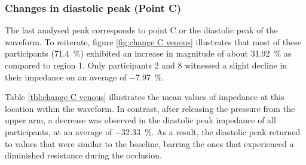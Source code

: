 \subsubsection{Changes in diastolic peak (Point C)}
\label{section apa 2.1.3}
The last analysed peak corresponds to point C or the diastolic peak of the waveform. To reiterate, figure \ref{fig:change C venous} illustrates that most of these participants (\SI{71.4}{\percent}) exhibited an increase in magnitude of about \SI{31.92}{\percent} as compared to region 1. Only participants 2 and 8 witnessed a slight decline in their impedance on an average of \SI{-7.97}{\percent}. 

Table \ref{tbl:change C venous} illustrates the mean values of impedance at this location within the waveform. In contrast, after releasing the pressure from the upper arm, a decrease was observed in the diastolic peak impedance of all participants, at an average of \SI{-32.33}{\percent}. As a result, the diastolic peak returned to values that were similar to the baseline, barring the ones that experienced a diminished resistance during the occlusion.

